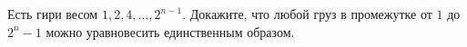 Есть гири весом $1, 2, 4, \dots, 2^{n - 1}$. Докажите, что любой груз в промежутке от $1$ до $2^n - 1$ можно уравновесить
единственным образом.